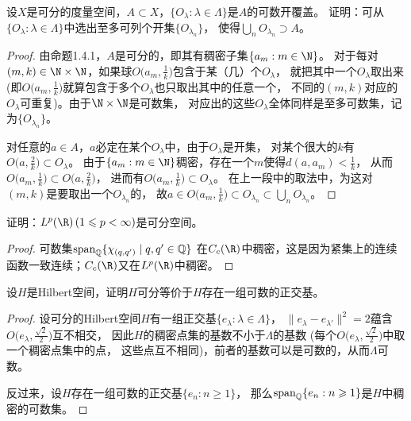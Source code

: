 \begin{7}
    设$X$是可分的度量空间，$A \subset X$，$\{O_\lambda:\lambda\in\varLambda\}$是$A$的可数开覆盖。
    证明：可从$\{O_\lambda:\lambda\in\varLambda\}$中选出至多可列个开集$\{O_{\lambda_n}\}$，
    使得$\bigcup\limits_nO_{\lambda_n} \supset A$。
\end{7}
\begin{proof}
    由命题1.4.1，$A$是可分的，即其有稠密子集$\{a_m:m\in\N\}$。
    对于每对$(m,k)\in\N\times\N$，如果球$O\big(a_m,\frac{1}{k}\big)$包含于某（几）个$O_\lambda$，
    就把其中一个$O_\lambda$取出来 (即$O\big(a_m,\frac{1}{k}\big)$就算包含于多个$O_\lambda$也只取出其中的任意一个，
    不同的$(m,k)$对应的$O_\lambda$可重复)。由于$\N\times\N$是可数集，
    对应出的这些$O_\lambda$全体同样是至多可数集，记为$\{O_{\lambda_n}\}$。
    
    对任意的$a \in A$，$a$必定在某个$O_\lambda$中，由于$O_\lambda$是开集，
    对某个很大的$k$有$O\big(a,\frac{2}{k}\big) \subset O_\lambda$。
    由于$\{a_m:m\in\N\}$稠密，存在一个$m$使得$d(a,a_m)<\frac{1}{k}$，
    从而$O\big(a_m,\frac{1}{k}\big) \subset O\big(a,\frac{2}{k}\big)$，
    进而有$O\big(a_m,\frac{1}{k}\big) \subset O_\lambda$。
    在上一段中的取法中，为这对$(m,k)$是要取出一个$O_{\lambda_n}$的，
    故$a \in O\big(a_m,\frac{1}{k}\big) \subset O_{\lambda_n} \subset \bigcup\limits_nO_{\lambda_n}$。
\end{proof}

\begin{11}
    证明：$L^p(\R)\,(1\leqslant p<\infty)$是可分空间。
\end{11}
\begin{proof}
    可数集$\operatorname{span}_{\mathbb{Q}}\{\chi_{(q,q')}\mid q,q'\in\mathbb{Q}\}$
    在$C_c(\R)$中稠密，这是因为紧集上的连续函数一致连续；$C_c(\R)$又在$L^p(\R)$中稠密。
\end{proof}

\begin{13}
    设$H$是Hilbert空间，证明$H$可分等价于$H$存在一组可数的正交基。
\end{13}
\begin{proof}
    设可分的Hilbert空间$H$有一组正交基$\{e_\lambda:\lambda\in\varLambda\}$，
    $\|e_\lambda-e_{\lambda'}\|^2=2$蕴含$O\big(e_\lambda,\frac{\sqrt{2}}{2}\big)$互不相交，
    因此$H$的稠密点集的基数不小于$\varLambda$的基数 
    (每个$O\big(e_\lambda,\frac{\sqrt{2}}{2}\big)$中取一个稠密点集中的点，
    这些点互不相同)，前者的基数可以是可数的，从而$\varLambda$可数。
    
    反过来，设$H$存在一组可数的正交基$\{e_n:n\geqslant1\}$，
    那么$\operatorname{span}_{\mathbb{Q}}\{e_n:n\geqslant1\}$是$H$中稠密的可数集。
\end{proof}


